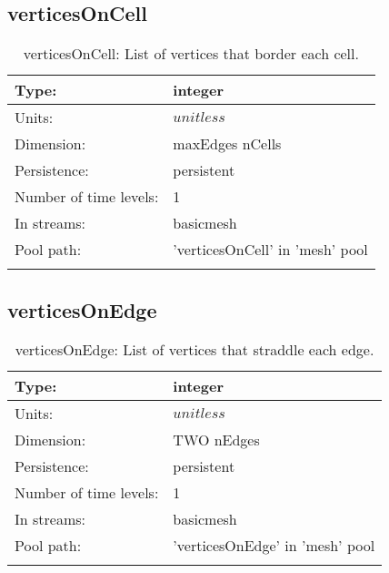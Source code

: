 \subsection[verticesOnCell]{verticesOnCell}
\label{subsec:var_sec_mesh_verticesOnCell}
\begin{center}
\begin{longtable}{| p{2.0in} | p{4.0in} |}
        \hline 
        Type: & integer \\
        \hline 
        Units: & $unitless$ \\
        \hline 
        Dimension: & maxEdges nCells \\
        \hline 
        Persistence: & persistent \\
        \hline 
        Number of time levels: & 1 \\
        \hline 
		 In streams: &  basicmesh \\
        \hline 
            Pool path: & 'verticesOnCell' in 'mesh' pool
 \\
		 \hline 
    \caption{verticesOnCell: List of vertices that border each cell.}
\end{longtable}
\end{center}
\subsection[verticesOnEdge]{verticesOnEdge}
\label{subsec:var_sec_mesh_verticesOnEdge}
\begin{center}
\begin{longtable}{| p{2.0in} | p{4.0in} |}
        \hline 
        Type: & integer \\
        \hline 
        Units: & $unitless$ \\
        \hline 
        Dimension: & TWO nEdges \\
        \hline 
        Persistence: & persistent \\
        \hline 
        Number of time levels: & 1 \\
        \hline 
		 In streams: &  basicmesh \\
        \hline 
            Pool path: & 'verticesOnEdge' in 'mesh' pool
 \\
		 \hline 
    \caption{verticesOnEdge: List of vertices that straddle each edge.}
\end{longtable}
\end{center}
